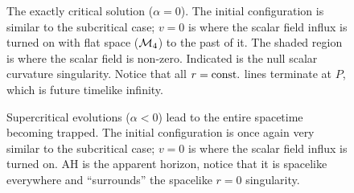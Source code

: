 \begin{figure}
 \caption{  The exactly critical solution ($\alpha = 0$).  The initial
configuration is similar to the subcritical case;  $v=0$ is where the scalar
field influx is turned on with flat space (${\cal M}_4$) to the past of it.
The shaded region is where the scalar field is non-zero.  Indicated is the null
scalar curvature singularity.  Notice that all $r={\rm const.}$ lines terminate
at $P$,  which is future timelike infinity.}
\end{figure}


\begin{figure}
 \caption{  Supercritical evolutions ($\alpha <0$) lead to the entire spacetime
becoming trapped.  The initial configuration is once again very similar to the
subcritical case; $v=0$ is where the scalar field influx is turned on.  AH is
the apparent horizon,  notice that it is spacelike everywhere and ``surrounds''
the spacelike $r=0$ singularity.}
\end{figure}





